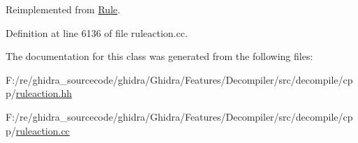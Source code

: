 Reimplemented from \mbox{\hyperlink{class_rule_a4023bfc7825de0ab866790551856d10e}{Rule}}.



Definition at line 6136 of file ruleaction.\+cc.



The documentation for this class was generated from the following files\+:\begin{DoxyCompactItemize}
\item 
F\+:/re/ghidra\+\_\+sourcecode/ghidra/\+Ghidra/\+Features/\+Decompiler/src/decompile/cpp/\mbox{\hyperlink{ruleaction_8hh}{ruleaction.\+hh}}\item 
F\+:/re/ghidra\+\_\+sourcecode/ghidra/\+Ghidra/\+Features/\+Decompiler/src/decompile/cpp/\mbox{\hyperlink{ruleaction_8cc}{ruleaction.\+cc}}\end{DoxyCompactItemize}
